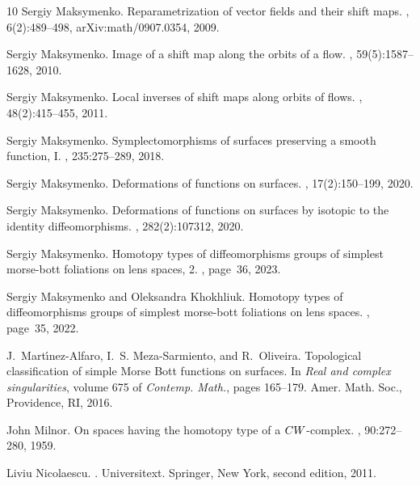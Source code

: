 \documentclass[10pt,reqno]{amsart}
\begin{document}
\begin{thebibliography}{10}
	Sergiy Maksymenko.
	\newblock Reparametrization of vector fields and their shift maps.
	,
	6(2):489--498, arXiv:math/0907.0354, 2009.
	
	Sergiy Maksymenko.
	\newblock Image of a shift map along the orbits of a flow.
	, 59(5):1587--1628, 2010.
	
	Sergiy Maksymenko.
	\newblock Local inverses of shift maps along orbits of flows.
	, 48(2):415--455, 2011.
	
	Sergiy Maksymenko.
	\newblock Symplectomorphisms of surfaces preserving a smooth function, {I}.
	, 235:275--289, 2018.
	
	Sergiy Maksymenko.
	\newblock Deformations of functions on surfaces.
	,
	17(2):150--199, 2020.
	
	Sergiy Maksymenko.
	\newblock Deformations of functions on surfaces by isotopic to the identity
	diffeomorphisms.
	, 282(2):107312, 2020.
	
	Sergiy Maksymenko.
	\newblock Homotopy types of diffeomorphisms groups of simplest morse-bott
	foliations on lens spaces, 2.
	, page~36, 2023.
	
	Sergiy Maksymenko and Oleksandra Khokhliuk.
	\newblock Homotopy types of diffeomorphisms groups of simplest morse-bott
	foliations on lens spaces.
	, page~35, 2022.
	
	J.~Mart\'{\i}nez-Alfaro, I.~S. Meza-Sarmiento, and R.~Oliveira.
	\newblock Topological classification of simple {M}orse {B}ott functions on
	surfaces.
	\newblock In {\em Real and complex singularities}, volume 675 of {\em Contemp.
		Math.}, pages 165--179. Amer. Math. Soc., Providence, RI, 2016.
	
	John Milnor.
	\newblock On spaces having the homotopy type of a {${\rm CW}$}-complex.
	, 90:272--280, 1959.
	
	Liviu Nicolaescu.
	.
	\newblock Universitext. Springer, New York, second edition, 2011.
	

\end{thebibliography}
\end{document}
